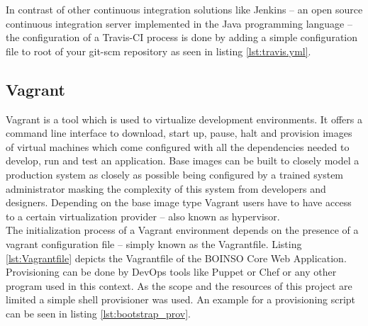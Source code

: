 \documentclass[BachelorPaper]{subfiles}
\begin{document}
In contrast of other continuous integration solutions like Jenkins -- an open source continuous integration server implemented in the Java programming language -- the configuration of a Travis-CI process is done by adding a simple configuration file to root of your \ac{git-scm} repository as seen in listing \ref{lst:travis.yml}.\\



\subsection{Vagrant}
\label{subsec:mat_vagrant}
Vagrant is a tool which is used to virtualize development environments. It offers a command line interface to download, start up, pause, halt and provision images of virtual machines which come configured with all the dependencies needed to develop, run and test an application. Base images can be built to closely model a production system as closely as possible being configured by a trained system administrator masking the complexity of this system from developers and designers. Depending on the base image type Vagrant users have to have access to a certain virtualization provider -- also known as hypervisor.\\

The initialization process of a Vagrant environment depends on the presence of a vagrant configuration file -- simply known as the Vagrantfile. Listing \ref{lst:Vagrantfile} depicts the Vagrantfile of the BOINSO Core Web Application.\\



Provisioning can be done by DevOps tools like Puppet or Chef or any other program used in this context. As the scope and the resources of this project are limited a simple shell provisioner was used. An example for a provisioning script can be seen in listing \ref{lst:bootstrap_prov}.\\
\end{document}
